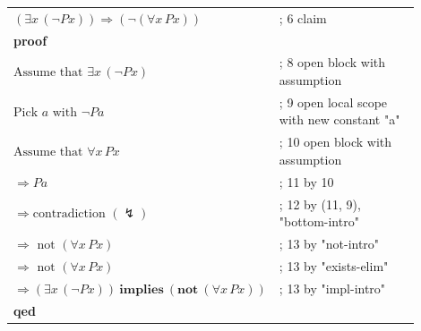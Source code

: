 \documentclass{article}
\begin{document}
\begin{flushleft}
\begin{tabular}{L{0.45\linewidth} L{0.45\linewidth}}
 $(\exists x\, (\neg P x)) \Rightarrow (\neg (\forall x\, P x))$ & ; 6 claim \\
\textbf{proof} & \\
\quad $\text{Assume that } \exists x\, (\neg P x)$                          & ; 8 open block with assumption \\
\quad\quad $\text{Pick } a \text{ with } \neg P a$                          & ; 9 open local scope with new constant "a" \\
\quad\quad\quad $\text{Assume that } \forall x\, P x$                       & ; 10 open block with assumption \\
\quad\quad\quad\quad $\Rightarrow P a$                                      & ; 11 by 10 \\
\quad\quad\quad\quad $\Rightarrow \text{contradiction } (\lightning)$       & ; 12 by (11, 9), "bottom-intro" \\
\quad\quad\quad $\Rightarrow \text{ not } (\forall x\, P x)$                & ; 13 by "not-intro" \\
\quad\quad $\Rightarrow \text{ not } (\forall x\, P x)$                     & ; 13 by "exists-elim" \\
\quad $\Rightarrow(\exists x\, (\neg P x)) \ \textbf{implies}\ (\textbf{not}\ (\forall x\, P x))$ & ; 13 by "impl-intro" \\
\textbf{qed}
\end{tabular}
\end{flushleft}
\end{document}
